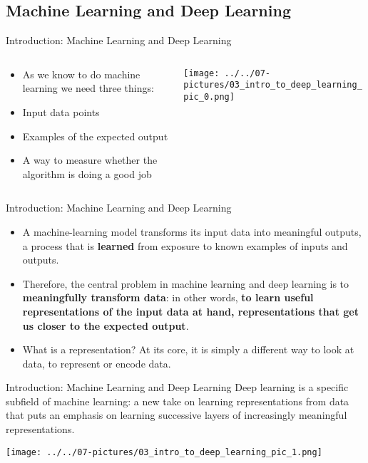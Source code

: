 \documentclass[11pt]{beamer}
\begin{document}
\subsection{Machine Learning and Deep Learning \\ \scalebox{0.8}{	}}
\begin{frame}{Introduction: Machine Learning and Deep Learning}
\begin{columns}[T] %
\begin{column}{.48\textwidth}
        \begin{itemize}
		\item As we know to do machine learning we need three things:
		\item Input data points
		\item Examples of the expected output
		\item A way to measure whether the algorithm is doing a good job
        \end{itemize}
\end{column}%
\hfill%
\begin{column}{.48\textwidth}
        \texttt{[image: ../../07-pictures/03\_intro\_to\_deep\_learning\_pic\_0.png]}
\end{column}%
\end{columns}
\end{frame}
\begin{frame}{Introduction: Machine Learning and Deep Learning}
	\begin{itemize}
		\item A machine-learning model transforms its input data into meaningful outputs, a process that is \textbf{learned} from exposure to known examples of inputs and outputs. 
		\item Therefore, the central problem in machine learning and deep learning is to \textbf{meaningfully transform data}: in other words, \textbf{to learn useful representations of the input data at hand, representations that get us closer to the expected output}. 
		\item What is a representation? At its core, it is simply a different way to look at data, to represent or encode data.
	\end{itemize}
\end{frame}
\begin{frame}{Introduction: Machine Learning and Deep Learning}
	Deep learning is a specific subfield of machine learning: a new take on learning representations from data that puts an emphasis on learning successive layers of increasingly meaningful representations.
	\begin{center}
	\texttt{[image: ../../07-pictures/03\_intro\_to\_deep\_learning\_pic\_1.png]}
	\end{center}
\end{frame}
\end{document}
